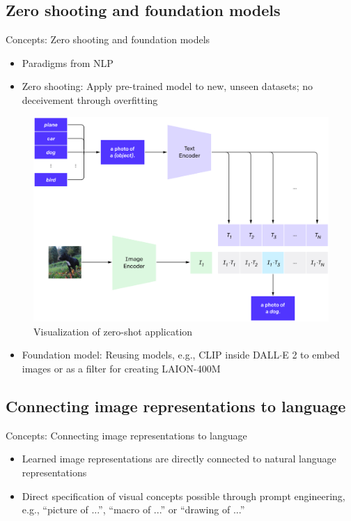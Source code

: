 \documentclass[xcolor=dvipsnames]{beamer}
\begin{document}
\subsection{Zero shooting and foundation models}
\begin{frame}{Concepts: Zero shooting and foundation models}
  \begin{itemize}
    \item Paradigms from NLP
    \item Zero shooting: Apply pre-trained model to new, unseen datasets; no deceivement through overfitting
  \end{itemize}

  \begin{figure}[ht]
    \begin{minipage}{0.67\textwidth}
      \centering
      \includegraphics[width=0.8\linewidth]{../../figures/02-04-text-support-img/zero-shooting}
    \end{minipage}
    \begin{minipage}[c]{0.3\textwidth}
      \caption{Visualization of zero-shot application \parencite{radford2021learning}}
    \end{minipage}
  \end{figure}

  \begin{itemize}
    \item Foundation model: Reusing models, e.g., CLIP inside DALL$\cdot$E 2 to embed images \parencite{ramesh2022hierarchical} or as a filter for creating LAION-400M \parencite{schuhmann2022laion}
  \end{itemize}
\end{frame}

\subsection{Connecting image representations to language}
\begin{frame}{Concepts: Connecting image representations to language}
  \begin{itemize}
    \item Learned image representations are directly connected to natural language representations
    \item Direct specification of visual concepts possible through prompt engineering, e.g., \enquote{picture of ...}, \enquote{macro of ...} or \enquote{drawing of ...}
  \end{itemize}
\end{frame}
\end{document}
